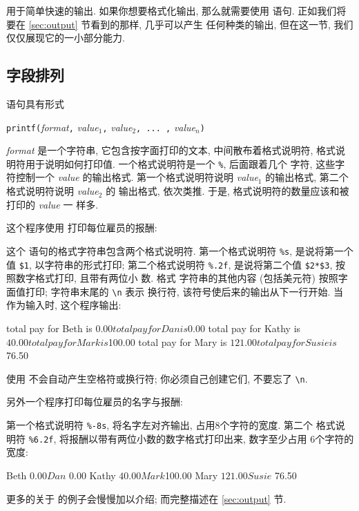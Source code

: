 \print 用于简单快速的输出. 如果你想要格式化输出, 那么就需要使用 \printf
语句. 正如我们将要在 \ref{sec:output} 节看到的那样, \printf 几乎可以产生
任何种类的输出, 但在这一节, 我们仅仅展现它的一小部分能力.

\subsection{字段排列}
\label{subsec:lining_up_fields}

\printf 语句具有形式
\begin{pattern}
    \texttt{printf(}\textit{format}\texttt{,} \textit{value$_1$}\texttt{,}
    \textit{value$_2$}\texttt{, ... ,} \textit{value$_n$}\texttt{)}
\end{pattern}
\textit{format} 是一个字符串, 它包含按字面打印的文本, 中间散布着格式说明符,
格式说明符用于说明如何打印值. 一个格式说明符是一个 \verb'%', 后面跟着几个
字符, 这些字符控制一个 \textit{value} 的输出格式. 第一个格式说明符说明
\textit{value$_1$} 的输出格式, 第二个格式说明符说明 \textit{value$_2$} 的
输出格式, 依次类推. 于是, 格式说明符的数量应该和被打印的 \textit{value} 一
样多.

这个程序使用 \printf 打印每位雇员的报酬:
这个 \printf 语句的格式字符串包含两个格式说明符. 第一个格式说明符
\verb'%s', 是说将第一个值 \verb'$1', 以字符串的形式打印; 第二个格式说明符
\verb'%.2f', 是说将第二个值 \verb'$2*$3', 按照数字格式打印, 且带有两位小
数. 格式
字符串的其他内容 (包括美元符) 按照字面值打印; 字符串末尾的 \verb'\n' 表示
换行符, 该符号使后来的输出从下一行开始. 当  作为输入时,
这个程序输出:
\begin{file}
    total pay for Beth is $0.00
    total pay for Dan is $0.00
    total pay for Kathy is $40.00
    total pay for Mark is $100.00
    total pay for Mary is $121.00
    total pay for Susie is $76.50
\end{file}
使用 \printf 不会自动产生空格符或换行符; 你必须自己创建它们, 不要忘了
\verb'\n'.

另外一个程序打印每位雇员的名字与报酬:
第一个格式说明符 \verb'%-8s', 将名字左对齐输出, 占用8个字符的宽度. 第二个
格式说明符 \verb'%6.2f', 将报酬以带有两位小数的数字格式打印出来,
数字至少占用
6个字符的宽度:
\begin{awkcode}
    Beth     $  0.00
    Dan      $  0.00
    Kathy    $ 40.00
    Mark     $100.00
    Mary     $121.00
    Susie    $ 76.50
\end{awkcode}
更多的关于 \printf 的例子会慢慢加以介绍; 而完整描述在
\ref{sec:output} 节.

